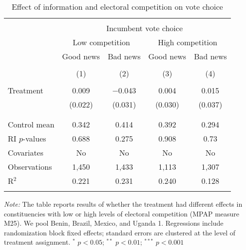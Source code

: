 
\begin{table}[!htbp] \centering 
  \caption{Effect of information and electoral competition on vote choice} 
  \label{competition} 
\begin{tabular}{@{\extracolsep{1pt}}lcccc} 
\\[-1.8ex]\hline 
\hline \\[-1.8ex] 
 & \multicolumn{4}{c}{Incumbent vote choice} \\ 
\cline{2-5} 
& \multicolumn{2}{c}{Low competition} &\multicolumn{2}{c}{High competition} \\
\cline{2-5}
 & Good news & Bad news & Good news & Bad news \\ 
\\[-1.8ex] & (1) & (2) & (3) & (4)\\ 
\hline \\[-1.8ex] 
 Treatment & 0.009 & $-$0.043 & 0.004 & 0.015 \\ 
  & (0.022) & (0.031) & (0.030) & (0.037) \\ 
  & & & & \\ 
\hline \\[-1.8ex] 
Control mean & 0.342 & 0.414 & 0.392 & 0.294 \\ 
RI $p$-values & 0.688 & 0.275 & 0.908 & 0.73 \\ 
Covariates & No & No & No & No \\ 
Observations & 1,450 & 1,433 & 1,113 & 1,307 \\ 
R$^{2}$ & 0.221 & 0.231 & 0.240 & 0.128 \\ 
\hline 
\hline \\[-1.8ex] 
\end{tabular} 
\begin{flushleft}\textit{Note:} The table reports results of whether the treatment had different effects in constituencies with low or high levels of electoral competition (MPAP measure M25). We pool Benin, Brazil, Mexico, and Uganda 1. Regressions include randomization block fixed effects; standard errors are clustered at the level of treatment assignment. $^*$ $p<0.05$; $^{**}$ $p<0.01$; $^{***}$ $p<0.001$ \end{flushleft}
\end{table} 
